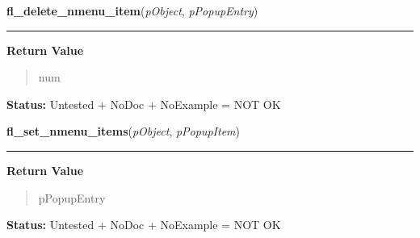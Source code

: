     \label{xformslib:library:fl_delete_nmenu_item}

    \vspace{0.5ex}

\hspace{.8\funcindent}\begin{boxedminipage}{\funcwidth}

    \raggedright \textbf{fl\_delete\_nmenu\_item}(\textit{pObject}, \textit{pPopupEntry})

    \vspace{-1.5ex}

    \rule{\textwidth}{0.5\fboxrule}
\setlength{\parskip}{2ex}
\setlength{\parskip}{1ex}
      \textbf{Return Value}
    \vspace{-1ex}

      \begin{quote}
      num

      \end{quote}

\textbf{Status:} Untested + NoDoc + NoExample = NOT OK



    \end{boxedminipage}

    \label{xformslib:library:fl_set_nmenu_items}

    \vspace{0.5ex}

\hspace{.8\funcindent}\begin{boxedminipage}{\funcwidth}

    \raggedright \textbf{fl\_set\_nmenu\_items}(\textit{pObject}, \textit{pPopupItem})

    \vspace{-1.5ex}

    \rule{\textwidth}{0.5\fboxrule}
\setlength{\parskip}{2ex}
\setlength{\parskip}{1ex}
      \textbf{Return Value}
    \vspace{-1ex}

      \begin{quote}
      pPopupEntry

      \end{quote}

\textbf{Status:} Untested + NoDoc + NoExample = NOT OK



    \end{boxedminipage}

